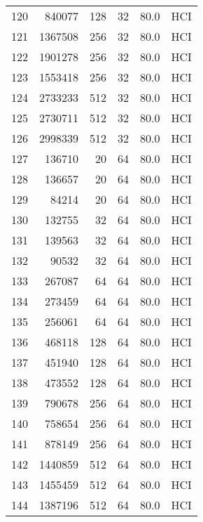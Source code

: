 \begin{longtable}{lrrrrl}
120 &    840077 &        128 &        32 &           80.0 &  HCI \\
121 &   1367508 &        256 &        32 &           80.0 &  HCI \\
122 &   1901278 &        256 &        32 &           80.0 &  HCI \\
123 &   1553418 &        256 &        32 &           80.0 &  HCI \\
124 &   2733233 &        512 &        32 &           80.0 &  HCI \\
125 &   2730711 &        512 &        32 &           80.0 &  HCI \\
126 &   2998339 &        512 &        32 &           80.0 &  HCI \\
127 &    136710 &         20 &        64 &           80.0 &  HCI \\
128 &    136657 &         20 &        64 &           80.0 &  HCI \\
129 &     84214 &         20 &        64 &           80.0 &  HCI \\
130 &    132755 &         32 &        64 &           80.0 &  HCI \\
131 &    139563 &         32 &        64 &           80.0 &  HCI \\
132 &     90532 &         32 &        64 &           80.0 &  HCI \\
133 &    267087 &         64 &        64 &           80.0 &  HCI \\
134 &    273459 &         64 &        64 &           80.0 &  HCI \\
135 &    256061 &         64 &        64 &           80.0 &  HCI \\
136 &    468118 &        128 &        64 &           80.0 &  HCI \\
137 &    451940 &        128 &        64 &           80.0 &  HCI \\
138 &    473552 &        128 &        64 &           80.0 &  HCI \\
139 &    790678 &        256 &        64 &           80.0 &  HCI \\
140 &    758654 &        256 &        64 &           80.0 &  HCI \\
141 &    878149 &        256 &        64 &           80.0 &  HCI \\
142 &   1440859 &        512 &        64 &           80.0 &  HCI \\
143 &   1455459 &        512 &        64 &           80.0 &  HCI \\
144 &   1387196 &        512 &        64 &           80.0 &  HCI \\

\end{longtable}
